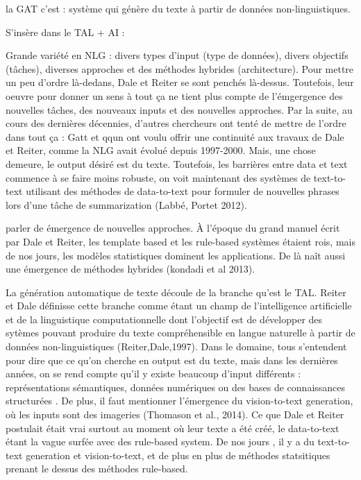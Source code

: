 la GAT c'est : système qui génère du texte à partir de données non-linguistiques.

S'insère dans le TAL + AI : 

Grande variété en NLG : divers types d'input (type de données), divers objectifs (tâches), diverses approches et des méthodes hybrides (architecture). Pour mettre un peu d'ordre là-dedans, Dale et Reiter se sont penchés là-dessus. Toutefois, leur oeuvre pour donner un sens à tout ça ne tient plus compte de l'émgergence des nouvelles tâches, des nouveaux inputs et des nouvelles approches. Par la suite, au cours des dernières décennies, d'autres chercheurs ont tenté de mettre de l'ordre dans tout ça :  Gatt et qqun ont voulu offrir une continuité aux travaux de Dale et Reiter, comme la NLG avait évolué depuis 1997-2000. Mais, une chose demeure, le output désiré est du texte. Toutefois, les barrières entre data et text commence à se faire moins robuste, on voit maintenant des systèmes de text-to-text utilisant des méthodes de data-to-text pour formuler de nouvelles phrases lors d'une tâche de summarization (Labbé, Portet 2012).

parler de émergence de nouvelles approches. À l'époque du grand manuel écrit par Dale et Reiter, les template based et les rule-based systèmes étaient rois, mais de nos jours, les modèles statistiques dominent les applications. De là naît aussi une émergence de méthodes hybrides (kondadi et al 2013).

La génération automatique de texte découle de la branche qu'est le TAL. Reiter et Dale définisse cette branche comme étant un champ de l'intelligence artificielle et de la linguistique computationnelle dont l'objectif est de développer des sytèmes pouvant produire du texte compréhensible en langue naturelle à partir de données non-linguistiques (Reiter,Dale,1997). Dans le domaine, tous s'entendent pour dire que ce qu'on cherche en output est du texte, mais dans les dernières années, on se rend compte qu'il y existe beaucoup d'input différents : représentations sémantiques, données numériques ou des bases de connaissances structurées \citep{GattSurveyStateArt2017}. De plus, il faut mentionner l'émergence du vision-to-text generation, où les inputs sont des imageries (Thomason et al., 2014). Ce que Dale et Reiter postulait était vrai surtout au moment où leur texte a été créé, le data-to-text étant la vague surfée avec des rule-based system. De nos jours , il y a du text-to-text generation et vision-to-text, et de plus en plus de méthodes statsitiques prenant le dessus des méthodes rule-based. 

